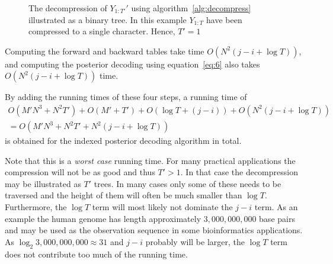 \begin{enumerate}
  \begin{figure}
    \centering
    
    \caption{The decompression of $Y_{1:T'}'$ using
      algorithm~\ref{alg:decompress} illustrated as a binary tree. In this
      example $Y_{1:T}$ have been compressed to a single character. Hence,
      $T' = 1$}
    \label{fig:decompression}
  \end{figure}

  Computing the forward and backward tables take time
  $O(N^2 (j - i + \log T))$, and computing the posterior decoding using
  equation~\eqref{eq:6} also takes $O(N^2 (j - i + \log T))$ time.
\end{enumerate}
By adding the running times of these four steps, a running time of
\begin{gather*}
  O\left(M' N^3 + N^2 T'\right) + O\left(M' + T'\right) + O\left(\log T + (j - i)\right) + O\left(N^2 (j - i + \log T)\right) \\
  = O\left(M' N^3 + N^2 T' + N^2 (j - i + \log T)\right)
\end{gather*}
is obtained for the indexed posterior decoding algorithm in total.

Note that this is a \emph{worst case} running time. For many practical
applications the compression will not be as good and thus $T' > 1$. In that
case the decompression may be illustrated as $T'$ trees. In many cases only
some of these needs to be traversed and the height of them will often be much
smaller than $\log T$. Furthermore, the $\log T$ term will most likely not
dominate the $j - i$ term. As an example the human genome has length
approximately $3,000,000,000$ base pairs and may be used as the observation sequence
in some bioinformatics applications. As $\log_2 3,000,000,000 \approx 31$ and
$j - i$ probably will be larger, the $\log T$ term does not contribute too much
of the running time.

